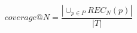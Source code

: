 \begin{equation}\label{eqn:Coverage}
coverage@N = \frac{\left | \cup_{p\in P} REC_{N}(p) \right | }{\left | T \right |} 
\end{equation}

\vspace{.1cm}
\vspace{.1cm}





%
%
%
%

